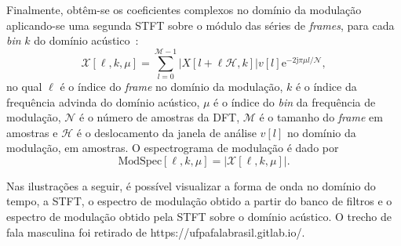 Finalmente, obtêm-se os coeficientes complexos no domínio da modulação
aplicando-se uma segunda STFT sobre o módulo das séries de \textit{frames}, para
cada \textit{bin} $k$ do domínio acústico~\cite{paliwal2015}:
\begin{equation} \label{modspec_stft}
      \mathcal{X}[\ell, k, \mu] = \sum_{l = 0}^{\mathcal{M}-1}\left\lvert X[l+\ell \mathcal{H},k] \right\rvert v[l]{\mathrm{e}^{-2\mathrm{j}\pi \mu l/\mathcal{N}}},      
\end{equation}
no qual $\ell$ é o índice do \textit{frame} no domínio da modulação, $k$ é o
 índice da frequência advinda do domínio acústico, $\mu$ é o índice do
 \textit{bin} da frequência de modulação, $\mathcal{N}$ é o número de amostras
 da DFT, $\mathcal{M}$ é o tamanho do \textit{frame} em amostras e $\mathcal{H}$
 é o deslocamento da janela de análise $v[l]$ no domínio da modulação, em
 amostras. O espectrograma de modulação é dado por
\begin{equation}
\mathrm{ModSpec}[\ell, k, \mu] = \left\lvert \mathcal{X}[\ell, k, \mu]\right\rvert. 
\end{equation}

Nas ilustrações a seguir, é possível visualizar a forma de onda no domínio do
tempo, a STFT, o espectro de modulação obtido a partir do banco de filtros e o
espectro de modulação obtido pela STFT sobre o domínio acústico. O trecho de
fala masculina foi retirado de https://ufpafalabrasil.gitlab.io/.